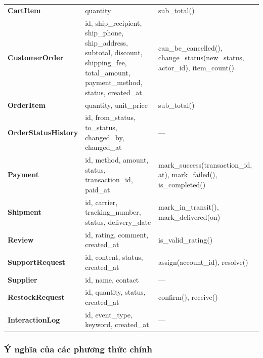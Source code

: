 \documentclass[12pt,a4paper,oneside]{report}
\begin{document}
\begin{longtable}{>{\raggedright\arraybackslash\small\bfseries}p{3.3cm}>{\raggedright\arraybackslash\ttfamily\footnotesize}p{6.2cm}>{\raggedright\arraybackslash\ttfamily\footnotesize}p{6.3cm}}
CartItem & quantity & sub\_total() \\
CustomerOrder & id, ship\_recipient, ship\_phone, ship\_address, subtotal, discount, shipping\_fee, total\_amount, payment\_method, status, created\_at & can\_be\_cancelled(), change\_status(new\_status, actor\_id), item\_count() \\
OrderItem & quantity, unit\_price & sub\_total() \\
OrderStatusHistory & id, from\_status, to\_status, changed\_by, changed\_at & --- \\
Payment & id, method, amount, status, transaction\_id, paid\_at & mark\_success(transaction\_id, at), mark\_failed(), is\_completed() \\
Shipment & id, carrier, tracking\_number, status, delivery\_date & mark\_in\_transit(), mark\_delivered(on) \\
Review & id, rating, comment, created\_at & is\_valid\_rating() \\
SupportRequest & id, content, status, created\_at & assign(account\_id), resolve() \\
Supplier & id, name, contact & --- \\
RestockRequest & id, quantity, status, created\_at & confirm(), receive() \\
InteractionLog & id, event\_type, keyword, created\_at & --- \\
\end{longtable}

\subsubsection*{Ý nghĩa của các phương thức chính}
\end{document}
